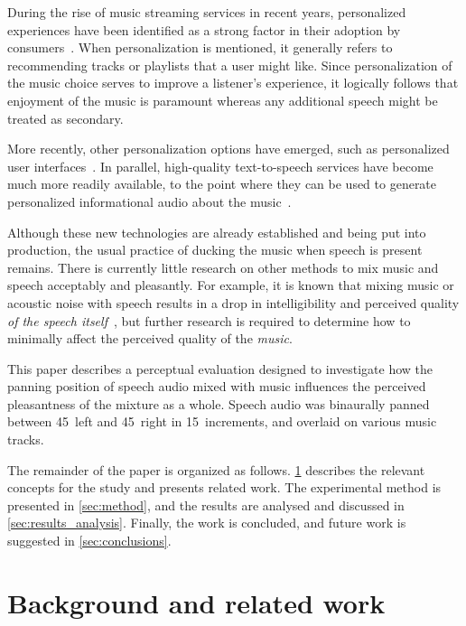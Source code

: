 \documentclass[fleqn]{jaes}
\begin{document}
During the rise of music streaming services in recent years, personalized experiences have been identified as a strong factor in their adoption by consumers~\cite{barataMusicStreamingServices2021}. When personalization is mentioned, it generally refers to recommending tracks or playlists that a user might like. Since personalization of the music choice serves to improve a listener's experience, it logically follows that enjoyment of the music is paramount whereas any additional speech might be treated as secondary.

More recently, other personalization options have emerged, such as personalized user interfaces~\cite{AIPersonalizationRevolutionizing2024}. In parallel, high-quality text-to-speech services have become much more readily available, to the point where they can be used to generate personalized informational audio about the music~\cite{SpotifyDebutsNew2023}. 

Although these new technologies are already established and being put into production, the usual practice of ducking the music when speech is present remains. There is currently little research on other methods to mix music and speech acceptably and pleasantly. For example, it is known that mixing music or acoustic noise with speech results in a drop in intelligibility and perceived quality \textit{of the speech itself}~\cite{fichnaPerceptualEvaluationSimulated2022}, but further research is required to determine how to minimally affect the perceived quality of the \textit{music}.

This paper describes a perceptual evaluation designed to investigate how the panning position of speech audio mixed with music influences the perceived pleasantness of the mixture as a whole. Speech audio was binaurally panned between 45\textdegree~left and 45\textdegree~right in 15\textdegree~increments, and overlaid on various music tracks.

The remainder of the paper is organized as follows. \cref{sec:background} describes the relevant concepts for the study and presents related work. The experimental method is presented in \cref{sec:method}, and the results are analysed and discussed in \cref{sec:results_analysis}. Finally, the work is concluded, and future work is suggested in \cref{sec:conclusions}.

\section{Background and related work}
\label{sec:background}
\end{document}
